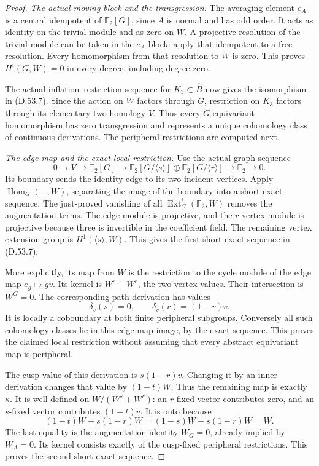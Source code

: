 \begin{proof}
\emph{The actual moving block and the transgression.}
The averaging element \(e_A\) is a central
idempotent of \(\mathbb F_2[G]\), since \(A\)
is normal and has odd order. It acts as
identity on the trivial module and as zero
on \(W\). A projective resolution of the
trivial module can be taken in the \(e_A\)
block: apply that idempotent to a free
resolution. Every homomorphism from that
resolution to \(W\) is zero. This proves
\(H^i(G,W)=0\) in every degree, including
degree zero.

The actual inflation--restriction sequence
for \(K_3\subset\widehat B\) now gives the
isomorphism in (D.53.7). Since the action
on \(W\) factors through \(G\), restriction
on \(K_3\) factors through its elementary
two-homology \(V\). Thus every
\(G\)-equivariant homomorphism has zero
transgression and represents a unique
cohomology class of continuous derivations.
The peripheral restrictions are computed next.

\emph{The edge map and the exact local restriction.}
Use the actual graph sequence
\[
 0\longrightarrow V\longrightarrow
 \mathbb F_2[G]\longrightarrow
 \mathbb F_2[G/\langle s\rangle]\oplus
 \mathbb F_2[G/\langle r\rangle]
 \longrightarrow\mathbb F_2\longrightarrow0 .
 \tag{D.53.13}
\]
Its boundary sends the identity edge to its
two incident vertices. Apply
\(\operatorname{Hom}_G(-,W)\), separating the
image of the boundary into a short exact
sequence. The just-proved vanishing of
all \(\operatorname{Ext}_G^i(\mathbb F_2,W)\)
removes the augmentation terms.
The edge module is projective, and the
\(r\)-vertex module is projective because
three is invertible in the coefficient
field. The remaining vertex extension
group is \(H^1(\langle s\rangle,W)\).
This gives the first short exact sequence
in (D.53.7).

More explicitly, its map from \(W\) is
the restriction to the cycle module of
the edge map \(e_g\mapsto gv\).
Its kernel is \(W^s+W^r\), the two vertex
values. Their intersection is \(W^G=0\).
The corresponding path derivation has
values
\[
                 \delta_v(s)=0,\qquad
                 \delta_v(r)=(1-r)v .
\]
It is locally a coboundary at both finite
peripheral subgroups. Conversely all such
cohomology classes lie in this edge-map
image, by the exact sequence. This proves
the claimed local restriction without
assuming that every abstract equivariant
map is peripheral.

The cusp value of this derivation is
\(s(1-r)v\). Changing it by an inner
derivation changes that value by
\((1-t)W\). Thus the remaining map is
exactly \(\kappa\). It is well-defined
on \(W/(W^s+W^r)\): an \(r\)-fixed
vector contributes zero, and an \(s\)-fixed
vector contributes \((1-t)v\).
It is onto because
\[
       (1-t)W+s(1-r)W
           =(1-s)W+s(1-r)W=W .
 \tag{D.53.14}
\]
The last equality is the augmentation
identity \(W_G=0\), already implied by
\(W_A=0\). Its kernel consists exactly
of the cusp-fixed peripheral restrictions.
This proves the second short exact sequence.


\end{proof}
